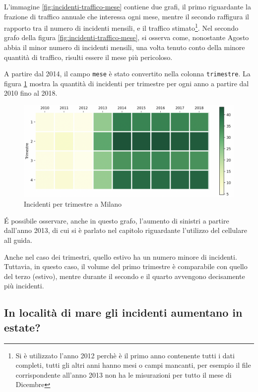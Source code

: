 \documentclass[a4paper,12pt]{report}
\newcommand{\columnstyle}[1]{\texttt{#1}}
\begin{document}
L'immagine \ref{fig:incidenti-traffico-mese} contiene due grafi, 
il primo riguardante la frazione di traffico annuale che interessa ogni mese, 
mentre il secondo raffigura il rapporto tra il numero di incidenti mensili, e il traffico 
stimato\footnote{Si è utilizzato l'anno 2012 perchè è il primo anno contenente tutti i dati completi, 
tutti gli altri anni hanno mesi o campi mancanti, per esempio il file corrispondente all'anno 
2013 non ha le misurazioni per tutto il mese di Dicembre}.
Nel secondo grafo della figura \ref{fig:incidenti-traffico-mese}, si osserva come, 
nonostante Agosto abbia il minor numero di incidenti mensili, 
una volta tenuto conto della minore quantità di traffico, risulti essere 
il mese più pericoloso.

A partire dal 2014, il campo \columnstyle{mese} è stato convertito nella 
colonna \columnstyle{trimestre}.
La figura \ref{fig:milano-trimestri} mostra la quantità di incidenti per 
trimestre per ogni anno a partire dal 2010 fino al 2018.

\begin{figure}
    \includegraphics[width=\linewidth]{../src/incidenti/incidenti_senza_coords/mese_incidenti/trimestri.png}
    \caption{Incidenti per trimestre a Milano}
    \label{fig:milano-trimestri}
\end{figure}

\'E possibile osservare, anche in questo grafo, l'aumento di sinistri a partire dall'anno 2013, 
di cui si è parlato nel capitolo riguardante l'utilizzo del cellulare all guida.

Anche nel caso dei trimestri, quello estivo ha un numero minore di incidenti. 
Tuttavia, in questo caso, il volume del primo trimestre è comparabile con quello del terzo 
(estivo), mentre durante il secondo e il quarto avvengono decisamente più incidenti.


\subsection{In località di mare gli incidenti aumentano in estate?}
\end{document}
